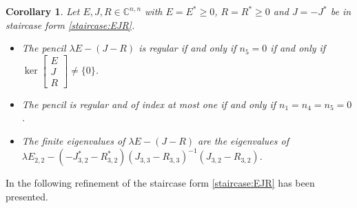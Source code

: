 \documentclass[11pt]{article}
\newcommand {\mat}[1]{\left[\begin{array}{#1}}
\newcommand {\rix}{\end{array}\right]}
\newtheorem{corollary}[theorem]{Corollary}
\def\eproof{\space
        {\ \vbox{\hrule\hbox{\vrule height1.3ex\hskip0.8ex\vrule}\hrule}}
        \bigskip}
\begin{document}

\begin{corollary}\label{cor} Let $E,J,R\in\mathbb C^{n,n}$ with $E=E^*\geq 0$, $R=R^*\geq 0$ and $J=-J^*$  be in staircase form \eqref{staircase:EJR}.

\begin{itemize}
\item [a)] The pencil $\lambda E-(J-R)$ is regular if and only if $n_5=0$ if and only if  $\ker \mat{c} E\\ J\\ R\rix\neq \{0\}$.
\item [b)] The pencil is regular and of index at most one if and only if $n_1=n_4=n_5=0$.
\item [c)] The finite eigenvalues of $\lambda E-(J-R)$ are the eigenvalues of\\ $\lambda E_{2,2}- (-J_{3,2}^*-R_{3,2}^*)(J_{3,3}-R_{3,3})^{-1} (J_{3,2}-R_{3,2})$.
\end{itemize}
\end{corollary}
In \cite{AchAM21} the following refinement of the staircase form \eqref{staircase:EJR} has been presented.
%
\end{document}
